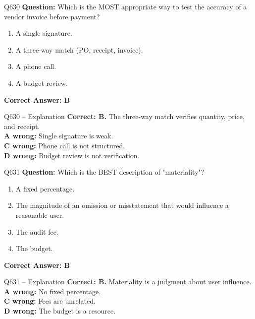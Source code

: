 \documentclass[aspectratio=169,10pt]{beamer}
\begin{document}
	\begin{frame}[t]{Q630}
		\small
		\textbf{Question:} Which is the MOST appropriate way to test the accuracy of a vendor invoice before payment?
		\begin{enumerate}[label=\Alph*.,itemsep=1pt,topsep=2pt]
			\item A single signature.
			\item A three-way match (PO, receipt, invoice).
			\item A phone call.
			\item A budget review.
		\end{enumerate}
		\vspace{4pt}
		\textbf{Correct Answer: B}
	\end{frame}
	
	\begin{frame}[t]{Q630 -- Explanation}
		\small
		\textbf{Correct: B.} The three-way match verifies quantity, price, and receipt. \\[4pt]
		\textbf{A wrong:} Single signature is weak. \\[2pt]
		\textbf{C wrong:} Phone call is not structured. \\[2pt]
		\textbf{D wrong:} Budget review is not verification.
	\end{frame}
	
	\begin{frame}[t]{Q631}
		\small
		\textbf{Question:} Which is the BEST description of "materiality"?
		\begin{enumerate}[label=\Alph*.,itemsep=1pt,topsep=2pt]
			\item A fixed percentage.
			\item The magnitude of an omission or misstatement that would influence a reasonable user.
			\item The audit fee.
			\item The budget.
		\end{enumerate}
		\vspace{4pt}
		\textbf{Correct Answer: B}
	\end{frame}
	
	\begin{frame}[t]{Q631 -- Explanation}
		\small
		\textbf{Correct: B.} Materiality is a judgment about user influence. \\[4pt]
		\textbf{A wrong:} No fixed percentage. \\[2pt]
		\textbf{C wrong:} Fees are unrelated. \\[2pt]
		\textbf{D wrong:} The budget is a resource.
	\end{frame}
	
\end{document}
